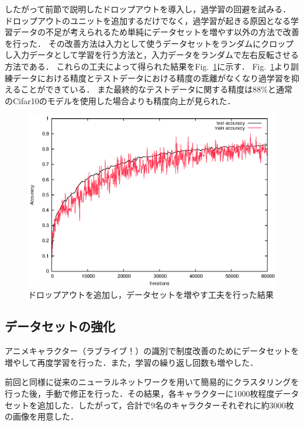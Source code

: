 \documentclass[a4paper,10pt]{jsarticle}
\begin{document}
したがって前節で説明したドロップアウトを導入し，過学習の回避を試みる．
ドロップアウトのユニットを追加するだけでなく，過学習が起きる原因となる学習データの不足が考えられるため単純にデータセットを増やす以外の方法で改善を行った．
その改善方法は入力として使うデータセットをランダムにクロップし入力データとして学習を行う方法と，入力データをランダムで左右反転させる方法である．
これらの工夫によって得られた結果をFig.~\ref{fig:ドロップアウトを追加し，データセットを増やす工夫を行った結果}に示す．
Fig.~\ref{fig:ドロップアウトを追加し，データセットを増やす工夫を行った結果}より訓練データにおける精度とテストデータにおける精度の乖離がなくなり過学習を抑えることができている．
また最終的なテストデータに関する精度は$88\%$と通常のCifar10のモデルを使用した場合よりも精度向上が見られた．

\begin{figure}[tb]
  \begin{center}
    \includegraphics[clip,width=12cm]{./fig/eps/dropout.eps}
  \end{center}
  \caption{ドロップアウトを追加し，データセットを増やす工夫を行った結果}
  \label{fig:ドロップアウトを追加し，データセットを増やす工夫を行った結果}
\end{figure}

\subsection{データセットの強化}

アニメキャラクター（ラブライブ！）の識別で制度改善のためにデータセットを増やして再度学習を行った．また，学習の繰り返し回数も増やした．

前回と同様に従来のニューラルネットワークを用いて簡易的にクラスタリングを行った後，手動で修正を行った．その結果，各キャラクターに1000枚程度データセットを追加した．したがって，合計で9名のキャラクターそれぞれに約3000枚の画像を用意した．
\end{document}
